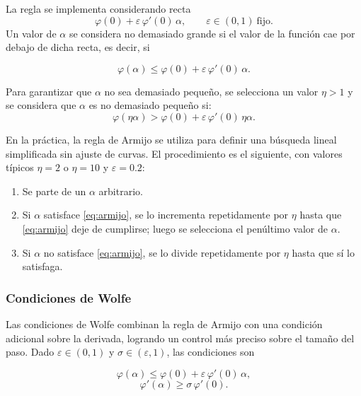 \documentclass[11pt]{article}
\theoremstyle{ejstyle}
\theoremstyle{ejstyle}
\theoremstyle{ejstyle}
\theoremstyle{ejstyle}
\theoremstyle{ejstyle}
\theoremstyle{ejstyle}
\theoremstyle{ejstyle}
\begin{document}
	La regla se implementa considerando recta
	\[
	\varphi(0) + \varepsilon\,\varphi'(0)\,\alpha, \qquad \varepsilon \in (0, 1) \ \text{fijo}.
	\]
	Un valor de $\alpha$ se considera no demasiado grande si el valor de la función cae por debajo de dicha recta, es decir, si
	
	\begin{equation}
		\varphi(\alpha) \leq \varphi(0) + \varepsilon\,\varphi'(0)\,\alpha.
		\label{eq:armijo}
	\end{equation}
	
	Para garantizar que $\alpha$ no sea demasiado pequeño, se selecciona un valor $\eta > 1$ y se considera que $\alpha$ es no demasiado pequeño si:
	\[
	\varphi(\eta\alpha) > \varphi(0) + \varepsilon\,\varphi'(0)\,\eta\alpha.
	\]
	
	En la práctica, la regla de Armijo se utiliza para definir una búsqueda lineal simplificada sin ajuste de curvas. El procedimiento es el siguiente, con valores típicos $\eta = 2$ o $\eta = 10$ y $\varepsilon = 0.2$:
	
	\begin{enumerate}
		\item Se parte de un $\alpha$ arbitrario.
		\item Si $\alpha$ satisface \eqref{eq:armijo}, se lo incrementa repetidamente por $\eta$ hasta que \eqref{eq:armijo} deje de cumplirse; luego se selecciona el penúltimo valor de $\alpha$.
		\item Si $\alpha$ no satisface \eqref{eq:armijo}, se lo divide repetidamente por $\eta$ hasta que sí lo satisfaga.
	\end{enumerate}
	
	\subsubsection{Condiciones de Wolfe}
	
	Las condiciones de Wolfe combinan la regla de Armijo con una condición adicional sobre la derivada, logrando un control más preciso sobre el tamaño del paso. Dado $\varepsilon \in (0, 1)$ y $\sigma \in (\varepsilon, 1)$, las condiciones son
	
	\begin{equation}
		\varphi(\alpha) \leq \varphi(0) + \varepsilon\,\varphi'(0)\,\alpha,
		\label{eq:wolfe1}
	\end{equation}
	\begin{equation}
		\varphi'(\alpha) \geq \sigma\,\varphi'(0).
		\label{eq:wolfe2}
	\end{equation}
	
\end{document}
